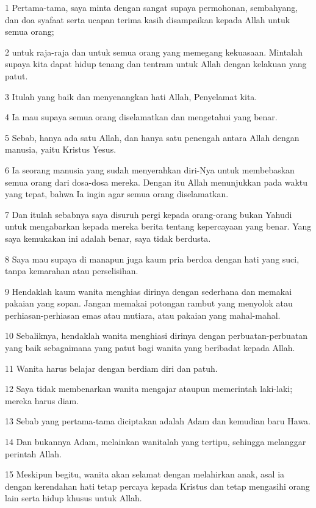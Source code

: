 \par 1 Pertama-tama, saya minta dengan sangat supaya permohonan, sembahyang, dan doa syafaat serta ucapan terima kasih disampaikan kepada Allah untuk semua orang;
\par 2 untuk raja-raja dan untuk semua orang yang memegang kekuasaan. Mintalah supaya kita dapat hidup tenang dan tentram untuk Allah dengan kelakuan yang patut.
\par 3 Itulah yang baik dan menyenangkan hati Allah, Penyelamat kita.
\par 4 Ia mau supaya semua orang diselamatkan dan mengetahui yang benar.
\par 5 Sebab, hanya ada satu Allah, dan hanya satu penengah antara Allah dengan manusia, yaitu Kristus Yesus.
\par 6 Ia seorang manusia yang sudah menyerahkan diri-Nya untuk membebaskan semua orang dari dosa-dosa mereka. Dengan itu Allah menunjukkan pada waktu yang tepat, bahwa Ia ingin agar semua orang diselamatkan.
\par 7 Dan itulah sebabnya saya disuruh pergi kepada orang-orang bukan Yahudi untuk mengabarkan kepada mereka berita tentang kepercayaan yang benar. Yang saya kemukakan ini adalah benar, saya tidak berdusta.
\par 8 Saya mau supaya di manapun juga kaum pria berdoa dengan hati yang suci, tanpa kemarahan atau perselisihan.
\par 9 Hendaklah kaum wanita menghias dirinya dengan sederhana dan memakai pakaian yang sopan. Jangan memakai potongan rambut yang menyolok atau perhiasan-perhiasan emas atau mutiara, atau pakaian yang mahal-mahal.
\par 10 Sebaliknya, hendaklah wanita menghiasi dirinya dengan perbuatan-perbuatan yang baik sebagaimana yang patut bagi wanita yang beribadat kepada Allah.
\par 11 Wanita harus belajar dengan berdiam diri dan patuh.
\par 12 Saya tidak membenarkan wanita mengajar ataupun memerintah laki-laki; mereka harus diam.
\par 13 Sebab yang pertama-tama diciptakan adalah Adam dan kemudian baru Hawa.
\par 14 Dan bukannya Adam, melainkan wanitalah yang tertipu, sehingga melanggar perintah Allah.
\par 15 Meskipun begitu, wanita akan selamat dengan melahirkan anak, asal ia dengan kerendahan hati tetap percaya kepada Kristus dan tetap mengasihi orang lain serta hidup khusus untuk Allah.

